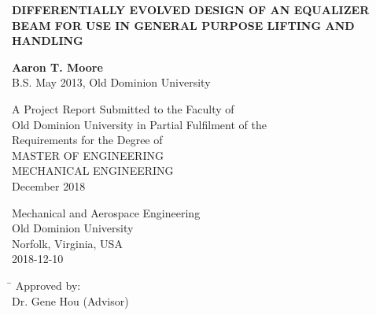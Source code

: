 \begin{titlepage}
   \begin{center}
       \vspace*{1cm}
       
       \Large
	   {\uppercase{\textbf{Differentially Evolved design of an Equalizer Beam for use in General Purpose Lifting and Handling}}\par}
       \normalsize

       \vspace{2.5cm}
 
       \textbf{Aaron T. Moore}\\
       B.S. May 2013, Old Dominion University
 
       \vfill
 
       A Project Report Submitted to the Faculty of\\
       Old Dominion University in Partial Fulfilment of the\\
       Requirements for the Degree of\\
       \vspace{1.0cm}
       \uppercase{Master of Engineering}\\
       \vspace{1em}
       \uppercase{Mechanical Engineering}\\
       \vspace{1em}
       {December 2018}\\

 
       \vspace{0.8cm}
 
 
       Mechanical  and Aerospace Engineering\\
       Old Dominion University\\
       Norfolk, Virginia, USA\\
       2018-12-10
 
   \end{center}
   \vspace{1cm}
   \begin{tabbing}
      \hspace*{11cm}\= \kill
      \>Approved by:\\
      \>Dr. Gene Hou (Advisor)
   \end{tabbing}
\end{titlepage}
